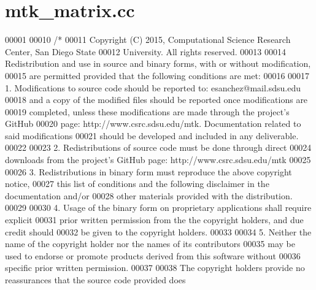 \hypertarget{mtk__matrix_8cc_source}{\section{mtk\+\_\+matrix.\+cc}
\label{mtk__matrix_8cc_source}
}

\begin{DoxyCode}
00001 
00010 \textcolor{comment}{/*}
00011 \textcolor{comment}{Copyright (C) 2015, Computational Science Research Center, San Diego State}
00012 \textcolor{comment}{University. All rights reserved.}
00013 \textcolor{comment}{}
00014 \textcolor{comment}{Redistribution and use in source and binary forms, with or without modification,}
00015 \textcolor{comment}{are permitted provided that the following conditions are met:}
00016 \textcolor{comment}{}
00017 \textcolor{comment}{1. Modifications to source code should be reported to: esanchez@mail.sdsu.edu}
00018 \textcolor{comment}{and a copy of the modified files should be reported once modifications are}
00019 \textcolor{comment}{completed, unless these modifications are made through the project's GitHub}
00020 \textcolor{comment}{page: http://www.csrc.sdsu.edu/mtk. Documentation related to said modifications}
00021 \textcolor{comment}{should be developed and included in any deliverable.}
00022 \textcolor{comment}{}
00023 \textcolor{comment}{2. Redistributions of source code must be done through direct}
00024 \textcolor{comment}{downloads from the project's GitHub page: http://www.csrc.sdsu.edu/mtk}
00025 \textcolor{comment}{}
00026 \textcolor{comment}{3. Redistributions in binary form must reproduce the above copyright notice,}
00027 \textcolor{comment}{this list of conditions and the following disclaimer in the documentation and/or}
00028 \textcolor{comment}{other materials provided with the distribution.}
00029 \textcolor{comment}{}
00030 \textcolor{comment}{4. Usage of the binary form on proprietary applications shall require explicit}
00031 \textcolor{comment}{prior written permission from the the copyright holders, and due credit should}
00032 \textcolor{comment}{be given to the copyright holders.}
00033 \textcolor{comment}{}
00034 \textcolor{comment}{5. Neither the name of the copyright holder nor the names of its contributors}
00035 \textcolor{comment}{may be used to endorse or promote products derived from this software without}
00036 \textcolor{comment}{specific prior written permission.}
00037 \textcolor{comment}{}
00038 \textcolor{comment}{The copyright holders provide no reassurances that the source code provided does}

\end{DoxyCode}
